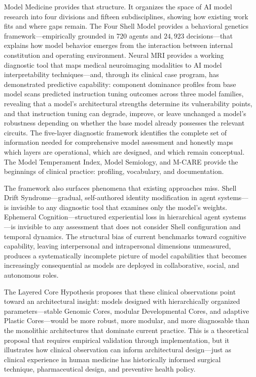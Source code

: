 \documentclass[11pt]{article}
\begin{document}
Model Medicine provides that structure. It organizes the space of AI model research into four divisions and fifteen subdisciplines, showing how existing work fits and where gaps remain. The Four Shell Model provides a behavioral genetics framework---empirically grounded in 720 agents and $24{,}923$ decisions---that explains how model behavior emerges from the interaction between internal constitution and operating environment. Neural MRI provides a working diagnostic tool that maps medical neuroimaging modalities to AI model interpretability techniques---and, through its clinical case program, has demonstrated predictive capability: component dominance profiles from base model scans predicted instruction tuning outcomes across three model families, revealing that a model's architectural strengths determine its vulnerability points, and that instruction tuning can degrade, improve, or leave unchanged a model's robustness depending on whether the base model already possesses the relevant circuits. The five-layer diagnostic framework identifies the complete set of information needed for comprehensive model assessment and honestly maps which layers are operational, which are designed, and which remain conceptual. The Model Temperament Index, Model Semiology, and M-CARE provide the beginnings of clinical practice: profiling, vocabulary, and documentation.

The framework also surfaces phenomena that existing approaches miss. Shell Drift Syndrome---gradual, self-authored identity modification in agent systems---is invisible to any diagnostic tool that examines only the model's weights. Ephemeral Cognition---structured experiential loss in hierarchical agent systems---is invisible to any assessment that does not consider Shell configuration and temporal dynamics. The structural bias of current benchmarks toward cognitive capability, leaving interpersonal and intrapersonal dimensions unmeasured, produces a systematically incomplete picture of model capabilities that becomes increasingly consequential as models are deployed in collaborative, social, and autonomous roles.

The Layered Core Hypothesis proposes that these clinical observations point toward an architectural insight: models designed with hierarchically organized parameters---stable Genomic Cores, modular Developmental Cores, and adaptive Plastic Cores---would be more robust, more modular, and more diagnosable than the monolithic architectures that dominate current practice. This is a theoretical proposal that requires empirical validation through implementation, but it illustrates how clinical observation can inform architectural design---just as clinical experience in human medicine has historically informed surgical technique, pharmaceutical design, and preventive health policy.
\end{document}
